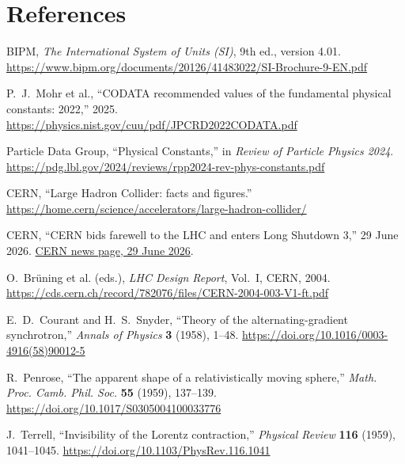 \documentclass[11pt,a4paper]{article}
\theoremstyle{definition}
\theoremstyle{plain}
\theoremstyle{remark}
\begin{document}
\section*{References}

\begin{enumerate}[label={[\arabic*]}]
  \item BIPM, \emph{The International System of Units (SI)},
  9th ed., version 4.01.
  \url{https://www.bipm.org/documents/20126/41483022/SI-Brochure-9-EN.pdf}
  \item P.\ J.\ Mohr et al., ``CODATA recommended values of the
  fundamental physical constants: 2022,'' 2025.
  \url{https://physics.nist.gov/cuu/pdf/JPCRD2022CODATA.pdf}
  \item Particle Data Group, ``Physical Constants,'' in
  \emph{Review of Particle Physics 2024}.
  \url{https://pdg.lbl.gov/2024/reviews/rpp2024-rev-phys-constants.pdf}
  \item CERN, ``Large Hadron Collider: facts and figures.''
  \url{https://home.cern/science/accelerators/large-hadron-collider/}
  \item CERN, ``CERN bids farewell to the LHC and enters Long
  Shutdown 3,'' 29 June 2026.
  \href{https://home.cern/cern-bids-farewell-to-the-lhc-and-enters-long-shutdown-3/}
  {CERN news page, 29 June 2026}.
  \item O.\ Br\"uning et al. (eds.), \emph{LHC Design Report},
  Vol.\ I, CERN, 2004.
  \url{https://cds.cern.ch/record/782076/files/CERN-2004-003-V1-ft.pdf}
  \item E.\ D.\ Courant and H.\ S.\ Snyder, ``Theory of the
  alternating-gradient synchrotron,'' \emph{Annals of Physics}
  \textbf{3} (1958), 1--48.
  \url{https://doi.org/10.1016/0003-4916(58)90012-5}
  \item R.\ Penrose, ``The apparent shape of a relativistically
  moving sphere,'' \emph{Math. Proc. Camb. Phil. Soc.}
  \textbf{55} (1959), 137--139.
  \url{https://doi.org/10.1017/S0305004100033776}
  \item J.\ Terrell, ``Invisibility of the Lorentz contraction,''
  \emph{Physical Review} \textbf{116} (1959), 1041--1045.
  \url{https://doi.org/10.1103/PhysRev.116.1041}
\end{enumerate}
\end{document}
